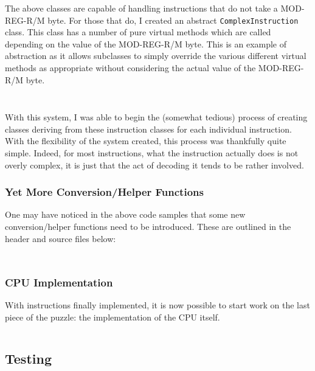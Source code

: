         \inputminted{c++}{code/third/instruction.hpp}

        \inputminted{c++}{code/third/instruction.cpp}

        The above classes are capable of handling instructions that do not take a MOD-REG-R/M byte. For those that do, I created an abstract \texttt{ComplexInstruction} class. This class has a number of pure virtual methods which are called depending on the value of the MOD-REG-R/M byte. This is an example of abstraction as it allows subclasses to simply override the various different virtual methods as appropriate without considering the actual value of the MOD-REG-R/M byte.

        \inputminted{c++}{code/third/complexinstruction.hpp}

        \inputminted{c++}{code/third/complexinstruction.cpp}

        With this system, I was able to begin the (somewhat tedious) process of creating classes deriving from these instruction classes for each individual instruction. With the flexibility of the system created, this process was thankfully quite simple. Indeed, for most instructions, what the instruction actually does is not overly complex, it is just that the act of decoding it tends to be rather involved.

    \subsubsection{Yet More Conversion/Helper Functions}
        One may have noticed in the above code samples that some new conversion/helper functions need to be introduced. These are outlined in the header and source files below:

        \inputminted{c++}{code/third/convert.hpp}

        \inputminted{c++}{code/third/convert.cpp}

    \subsubsection{CPU Implementation} \label{sec:third-cpu-implementation}
        With instructions finally implemented, it is now possible to start work on the last piece of the puzzle: the implementation of the CPU itself.

        \inputminted{c++}{code/third/intel8086.cpp}

\subsection{Testing}
